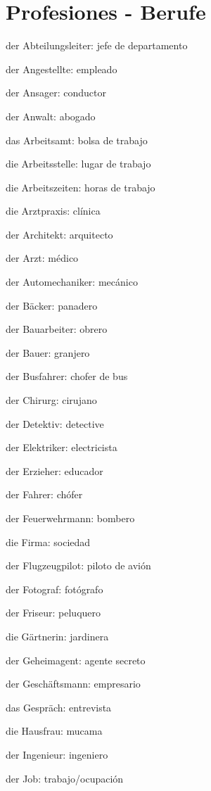 \section{Profesiones - Berufe}
\begin{multicols}{2}
\begin{myitemize}
\item der Abteilungsleiter: jefe de departamento
\item der Angestellte: empleado
\item der Ansager: conductor
\item der Anwalt: abogado
\item das Arbeitsamt: bolsa de trabajo
\item die Arbeitsstelle: lugar de trabajo
\item die Arbeitszeiten: horas de trabajo
\item die Arztpraxis: clínica
\item der Architekt: arquitecto
\item der Arzt: médico
\item der Automechaniker: mecánico
\item der Bäcker: panadero
\item der Bauarbeiter: obrero
\item der Bauer: granjero
\item der Busfahrer: chofer de bus
\item der Chirurg: cirujano
\item der Detektiv: detective
\item der Elektriker: electricista
\item der Erzieher: educador
\item der Fahrer: chófer
\item der Feuerwehrmann: bombero
\item die Firma: sociedad
\item der Flugzeugpilot: piloto de avión
\item der Fotograf: fotógrafo
\item der Friseur: peluquero
\item die Gärtnerin: jardinera
\item der Geheimagent: agente secreto
\item der Geschäftsmann: empresario
\item das Gespräch: entrevista
\item die Hausfrau: mucama
\item der Ingenieur: ingeniero
\item der Job: trabajo/ocupación

\end{myitemize}
\end{multicols}
